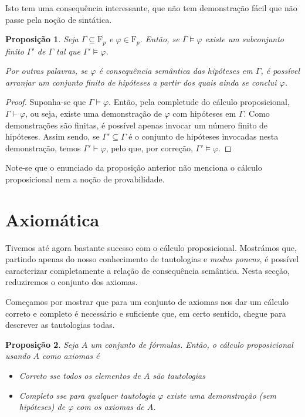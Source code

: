 \documentclass{report}
\newtheorem{prop}{Proposição}
\theoremstyle{definition}
\theoremstyle{remark}
\newcommand{\F}{\mathrm{F}}
\begin{document}
	Isto tem uma consequência interessante, que não tem demonstração fácil que não passe pela noção de sintática.
	
	\begin{prop}
	Seja $\Gamma \subseteq \F_p$ e $\varphi \in \F_p$. Então, se $\Gamma \vDash \varphi$ existe um subconjunto finito $\Gamma'$ de $\Gamma$ tal que $\Gamma' \vDash \varphi$.
	
	Por outras palavras, se $\varphi$ é consequência semântica das hipóteses em $\Gamma$, é possível arranjar um conjunto finito de hipóteses a partir dos quais ainda se conclui $\varphi$.
	\end{prop}
	
	\begin{proof}
	Suponha-se que $\Gamma \vDash \varphi$. Então, pela completude do cálculo proposicional, $\Gamma \vdash \varphi$, ou seja, existe uma demonstração de $\varphi$ com hipóteses em $\Gamma$. Como demonstrações são finitas, é possível apenas invocar um número finito de hipóteses. Assim sendo, se $\Gamma' \subseteq \Gamma$ é o conjunto de hipóteses invocadas nesta demonstração, temos $\Gamma' \vdash \varphi$, pelo que, por correção, $\Gamma' \vDash \varphi$.
	\end{proof}
	
	Note-se que o enunciado da proposição anterior não menciona o cálculo proposicional nem a noção de provabilidade.
	
	\section{Axiomática}
	
	Tivemos até agora bastante sucesso com o cálculo proposicional. Mostrámos que, partindo apenas do nosso conhecimento de tautologias e \textit{modus ponens}, é possível caracterizar completamente a relação de consequência semântica. Nesta secção, reduziremos o conjunto dos axiomas.
	
	Começamos por mostrar que para um conjunto de axiomas nos dar um cálculo correto e completo é necessário e suficiente que, em certo sentido, chegue para descrever as tautologias todas.
	
	\begin{prop}\label{axiomconditions}
	Seja $A$ um conjunto de fórmulas. Então, o cálculo proposicional usando $A$ como axiomas é
	
	\begin{itemize}
	\item Correto sse todos os elementos de $A$ são tautologias
	
	\item Completo sse para qualquer tautologia $\varphi$ existe uma demonstração (sem hipóteses) de $\varphi$ com os axiomas de $A$.
	\end{itemize} 
	\end{prop}
	
\end{document}

